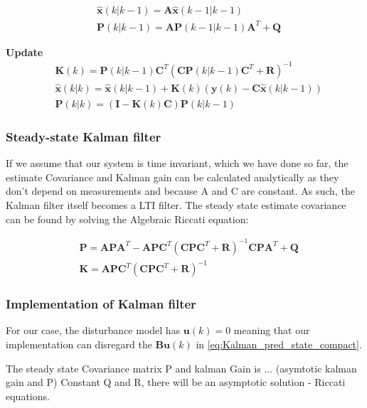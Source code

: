 \begin{align}
	&\hat{\textbf{x}}	(k|k-1) = \textbf{A} \hat{\textbf{x}}	(k-1|k-1) 		\label{eq:Kalman_pred_state_compact} 	\\
	&\textbf{P}			(k|k-1) = \textbf{A}\textbf{P}			(k-1|k-1)\textbf{A}^T+\textbf{Q} 				\label{eq:Kalman_pred_cov_compact} 		
\end{align}

\textbf{Update}
\begin{align}
	&\textbf{K}			(k) 		= \textbf{P}				(k|k-1)\textbf{C}^T(\textbf{C}\textbf{P}	(k|k-1)	\textbf{C}^T + \textbf{R})^{-1}										\label{eq:Kalman_upd_kalman_gain_compact} \\
	&\hat{\textbf{x}}	(k|k) 	= \hat{\textbf{x}}			(k|k-1) + \textbf{K}						(k)	(\textbf{y}		(k) - \textbf{C}\hat{\textbf{x}}		(k|k-1)) 	\label{eq:Kalman_upd_est_state_compact} \\
	&\textbf{P}			(k|k) 	= (\textbf{I} - \textbf{K}	(k)\textbf{C})\textbf{P}					(k|k-1)																		\label{eq:Kalman_upd_est_cov_compact}
\end{align}


\subsubsection{Steady-state Kalman filter}
If we assume that our system is time invariant, which we have done so far, the estimate Covariance and Kalman gain can be calculated analytically as they don't depend on measurements and because A and C are constant. As such, the Kalman filter itself becomes a LTI filter. The steady state estimate covariance can be found by solving the Algebraic Riccati equation:

\begin{align}
	&\textbf{P} = \textbf{APA}^T - \textbf{APC}^T(\textbf{CPC}^T+\textbf{R})^{-1} \textbf{CPA}^T+ \textbf{Q} \\
	&\textbf{K} = \textbf{APC}^T(\textbf{CPC}^T+\textbf{R})^{-1}
\end{align}


\subsubsection{Implementation of Kalman filter}
For our case, the disturbance model has $ \textbf{u}(k)=0 $ meaning that our implementation can disregard the $ \textbf{B}\textbf{u}(k) $ in \cref{eq:Kalman_pred_state_compact}.


The steady state Covariance matrix P and kalman Gain is ... (asymtotic kalman gain and P)
Constant Q and R, there will be an asymptotic solution - Riccati equations. 

